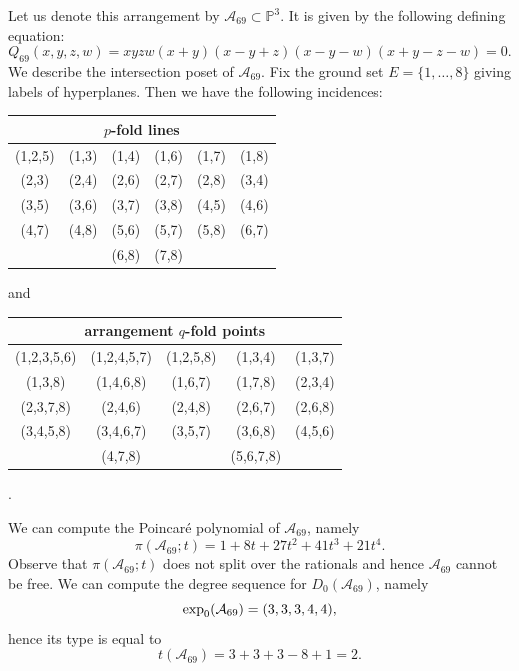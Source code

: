 \documentclass[11pt]{article}
\theoremstyle{plain}
\theoremstyle{definition}
\begin{document}
\noindent
{}
\vskip 5pt
\noindent
Let us denote this arrangement by $\mathcal{A}_{69} \subset \mathbb{P}^{3}$. It is given by the following defining equation:
$$Q_{69}(x,y,z,w) = xyzw(x+y)(x-y+z)(x-y-w)(x+y-z-w)=0.$$
We describe the intersection poset of $\mathcal{A}_{69}$. Fix the ground set $E= \{1, \ldots , 8\}$ giving labels of hyperplanes. Then we have the following incidences:
\begin{center}
\begin{tabular}{ c c c c c c }
\multicolumn{6}{c}{$p$-fold lines} \\\hline \hline
(1,2,5) & (1,3) & (1,4) & (1,6) & (1,7) & (1,8) \\
(2,3) & (2,4) & (2,6) & (2,7) & (2,8) & (3,4) \\
(3,5) & (3,6) & (3,7) & (3,8) & (4,5) & (4,6) \\
(4,7) & (4,8) & (5,6) & (5,7) & (5,8) & (6,7) \\
      &       & (6,8) & (7,8) &       &
\end{tabular}
\end{center}
and 
\begin{center}
\begin{tabular}{ c c c c c }
\multicolumn{5}{c}{arrangement $q$-fold points} \\ \hline \hline 
 (1,2,3,5,6) & (1,2,4,5,7) &  (1,2,5,8) &  (1,3,4) & (1,3,7) \\  (1,3,8) & (1,4,6,8) & (1,6,7) & (1,7,8) & (2,3,4) \\
 (2,3,7,8) & (2,4,6) & (2,4,8) & (2,6,7) & (2,6,8) \\
 (3,4,5,8) & (3,4,6,7) & (3,5,7) & (3,6,8) & (4,5,6) \\
           & (4,7,8) &  & (5,6,7,8) &
\end{tabular}.
\end{center}
We can compute the Poincar\'e polynomial of $\mathcal{A}_{69}$, namely
$$\pi(\mathcal{A}_{69};t) = 1 + 8t + 27t^{2} + 41t^{3} + 21t^{4}.$$
Observe that $\pi(\mathcal{A}_{69};t)$ does not split over the rationals and hence $\mathcal{A}_{69}$ cannot be free. We can compute the degree sequence for $D_{0}(\mathcal{A}_{69})$, namely
$${\rm exp}_{0}(\mathcal{A}_{69}) = (3,3,3,4,4),$$
hence its type is equal to
$$t(\mathcal{A}_{69})=3+3+3-8+1 = 2.$$

\end{document}
